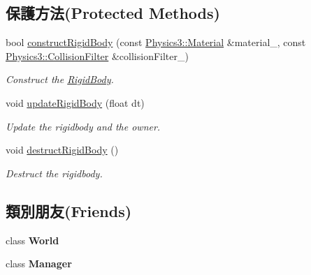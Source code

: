 \subsection*{保護方法(Protected Methods)}
\begin{DoxyCompactItemize}
\item 
bool \hyperlink{class_magnum_1_1_physics3_1_1_vehicle_a37648c149c5ad2c78868172fa1a6e5ff}{construct\+Rigid\+Body} (const \hyperlink{class_magnum_1_1_physics3_1_1_material}{Physics3\+::\+Material} \&material\+\_\+, const \hyperlink{class_magnum_1_1_physics3_1_1_collision_filter}{Physics3\+::\+Collision\+Filter} \&collision\+Filter\+\_\+)
\begin{DoxyCompactList}\small\item\em Construct the \hyperlink{class_magnum_1_1_physics3_1_1_rigid_body}{Rigid\+Body}. \end{DoxyCompactList}\item 
void \hyperlink{class_magnum_1_1_physics3_1_1_vehicle_a4532094d2d5972827a6cc8a89677cfd5}{update\+Rigid\+Body} (float dt)
\begin{DoxyCompactList}\small\item\em Update the rigidbody and the owner. \end{DoxyCompactList}\item 
void \hyperlink{class_magnum_1_1_physics3_1_1_vehicle_aa7b1de22c398bb2711ed6c7ec384f45b}{destruct\+Rigid\+Body} ()\hypertarget{class_magnum_1_1_physics3_1_1_vehicle_aa7b1de22c398bb2711ed6c7ec384f45b}{}\label{class_magnum_1_1_physics3_1_1_vehicle_aa7b1de22c398bb2711ed6c7ec384f45b}

\begin{DoxyCompactList}\small\item\em Destruct the rigidbody. \end{DoxyCompactList}\end{DoxyCompactItemize}
\subsection*{類別朋友(Friends)}
\begin{DoxyCompactItemize}
\item 
class {\bfseries World}\hypertarget{class_magnum_1_1_physics3_1_1_vehicle_a7b4bcdf992c21ae83363f25df05b1d25}{}\label{class_magnum_1_1_physics3_1_1_vehicle_a7b4bcdf992c21ae83363f25df05b1d25}

\item 
class {\bfseries Manager}\hypertarget{class_magnum_1_1_physics3_1_1_vehicle_adddd5c43ff870a047aa66db4edf82a7e}{}\label{class_magnum_1_1_physics3_1_1_vehicle_adddd5c43ff870a047aa66db4edf82a7e}

\end{DoxyCompactItemize}


